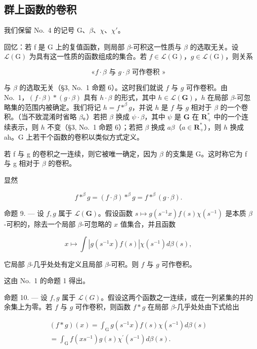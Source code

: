 \subsection{群上函数的卷积}

我们保留 No.~4 的记号 G、\(\beta\)、\(\chi\)、\(\chi'\)。

回忆：若 f 是 G 上的复值函数，则局部 \(\beta\)-可积这一性质与 \(\beta\) 的选取无关。设 \(\mathcal{L}(\mathrm{G})\) 为具有这一性质的函数组成的集合。若 \(f \in \mathcal{L}(\mathrm{G})\)，\(g \in \mathcal{L}(\mathrm{G})\)，则关系

\[\text{«}f \cdot \beta\text{ 与 }g \cdot \beta\text{ 可作卷积 »}\]

与 \(\beta\) 的选取无关（§3, No.~1 命题 6）。这时我们就说 \(f\) 与 \(g\) 可作卷积。由 No.~1，\((f\cdot \beta)*(g\cdot \beta)\) 具有 \(h\cdot \beta\) 的形式，其中 \(h\in \mathcal{L}(\mathbf{G})\)，\(h\) 在局部 \(\beta\)-可忽略集的范围内被确定。我们将记 \(h = f * ^ {\beta} g\)，并说 \(h\) 是 \(f\) 与 \(g\) 相对于 \(\beta\) 的一个卷积。（当不致混淆时省略 \(\beta\)。）若把 \(\beta\) 换成 \(\psi \cdot \beta\)，其中 \(\psi\) 是 \(\mathbf{G}\) 在 \(\mathbf{R}_+^*\) 中的一个连续表示，则 \(h\) 不变（§3, No.~1 命题 6）；若把 \(\beta\) 换成 \(a\beta\)（\(a\in \mathbf{R}_+^*\)），则 \(h\) 换成 ah。G 上若干个函数的卷积以类似方式定义。

若 f 与 g 的卷积之一连续，则它被唯一确定，因为 \(\beta\) 的支集是 G。这时称它为 f 与 g 相对于 \(\beta\) 的卷积。

显然

\[
f * ^ {\beta} g = (f \cdot \beta) * ^ {\beta} g = f * ^ {\beta} (g \cdot \beta).\tag{14}
\]

命题 9. --- 设 \(f,g\) 属于 \(\mathcal{L}(\mathbf{G})\)。假设函数 \(s\mapsto g(s^{-1}x)f(s)\chi(s^{-1})\) 是本质 \(\beta\)-可积的，除去一个局部 \(\beta\)-可忽略的 \(x\) 值集合，并且函数

\[
x \mapsto \int | g (s ^ {- 1} x) f (s) | \chi (s ^ {- 1}) d \beta (s),
\]

它局部 \(\beta\)-几乎处处有定义且局部 \(\beta\)-可积。则 \(f\) 与 \(g\) 可作卷积。

这由 No.~1 的命题 1 得出。

命题 10. --- 设 \(f, g\) 属于 \(\mathcal{L}(G)\)。假设这两个函数之一连续，或在一列紧集的并的余集上为零。若 \(f\) 与 \(g\) 可作卷积，则函数 \(f * g\) 在局部 \(\beta\)-几乎处处由下式给出

\[
\begin{array}{c} (f * g) (x) = \int_ {\mathrm{G}} g (s ^ {- 1} x) f (s) \chi (s ^ {- 1}) d \beta (s) \\ = \int_ {\mathrm{G}} f (x s ^ {- 1}) g (s) \chi^ {\prime} (s ^ {- 1}) d \beta (s). \end{array}\tag{15}
\]

